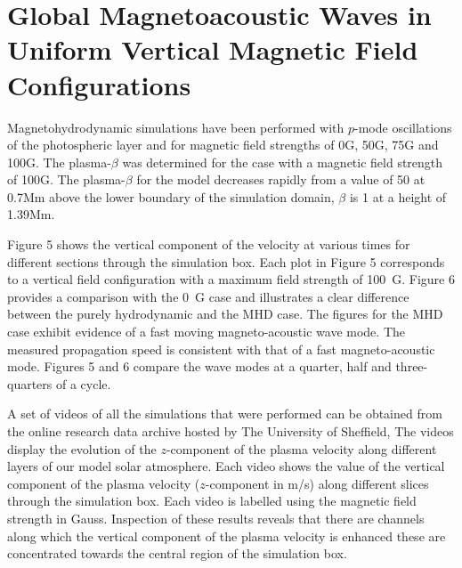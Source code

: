 \documentclass[physics,article,submit,pdftex,moreauthors]{Definitions/mdpi}
\begin{document}
\section{Global Magnetoacoustic Waves in Uniform Vertical Magnetic Field Configurations}

Magnetohydrodynamic simulations have been performed with $p$-mode oscillations of the photospheric layer and for magnetic field strengths of 0G, 50G, 75G and 100G. The plasma-$\beta$ was determined for the case with a magnetic field strength of 100G. The plasma-$\beta$ for the model decreases rapidly from a value of 50 at 0.7Mm above the lower boundary of the simulation domain, $\beta$ is 1 at a height of 1.39Mm.  



 Figure 5 %
 shows the vertical component of the velocity at various times for different sections through the simulation box. Each plot in  Figure 5 %
 corresponds to a vertical field configuration with a maximum field strength of 100~G. Figure 6 provides a comparison with the 0~G case and %
 illustrates a clear difference between the purely hydrodynamic and the MHD case.  The figures for the MHD case exhibit evidence of a fast moving magneto-acoustic wave mode. The measured propagation speed is consistent with that of a fast magneto-acoustic mode. Figures 5 and 6 compare the wave modes at a quarter, half and three-quarters of a cycle. 

 A set of videos of all the simulations that were performed can be obtained from the online research data archive hosted by The University of Sheffield, \citet{Griffiths2018a} 
 The videos display the evolution of the $z$-component of the plasma velocity along different layers of our model solar atmosphere. Each video shows the value of the vertical component of the plasma velocity ($z$-component in m/s) along different slices through the simulation box. Each video is labelled using the magnetic field strength in Gauss. Inspection of these results reveals that there are channels along which the vertical component of the plasma velocity is enhanced these are concentrated towards the central region of the simulation box.
  
\end{document}

